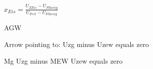 \( x_{Eis} = \frac{U_{ZEis} - U_{Flüssig}}{U_{Fest} - U_{Flüssig}} \)

AGW  

Arrow pointing to: Uzg minus Uzew equals zero  

Mg Uzg minus MEW Uzew equals zero